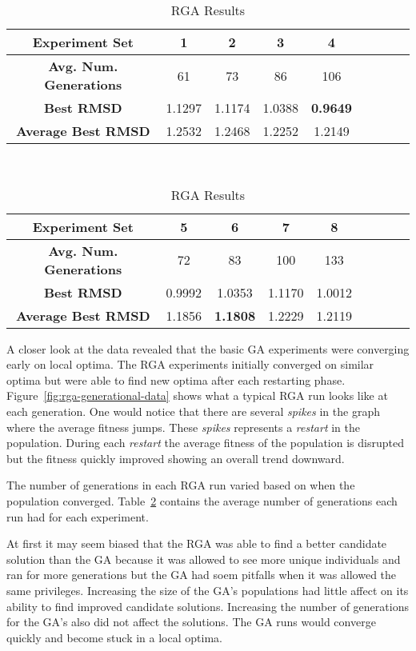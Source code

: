 \begin{table}
	\centering
	\begin{tabular}{ | >{\bfseries}c | c | c | c | c | c | c | c | c | }
		\hline
		Experiment Set & 1 & 2 & 3 & 4 \\ \hline
		Avg. Num. Generations & 61 & 73 & 86 & 106 \\ \hline
		Best RMSD & 1.1297 & 1.1174 & 1.0388 & \textbf{0.9649} \\ \hline
		Average Best RMSD & 1.2532 & 1.2468 & 1.2252 & 1.2149 \\ \hline
	\end{tabular}
	\\
	\vspace{3 mm}
	\begin{tabular}{ | >{\bfseries}c | c | c | c | c | c | c | c | c | }
		\hline
		Experiment Set & 5 & 6 & 7 & 8 \\ \hline
		Avg. Num. Generations & 72 & 83 & 100 & 133 \\ \hline
		Best RMSD & 0.9992 & 1.0353 & 1.1170 & 1.0012 \\ \hline
		Average Best RMSD & 1.1856 & \textbf{1.1808} & 1.2229 & 1.2119 \\ \hline
	\end{tabular}
	\caption{RGA Results}
	\label{table:rga-results}
\end{table}

A closer look at the data revealed that the basic GA experiments were converging early on local optima. The RGA experiments initially converged on similar optima but were able to find new optima after each restarting phase. Figure~\ref{fig:rga-generational-data} shows what a typical RGA run looks like at each generation. One would notice that there are several \textit{spikes} in the graph where the average fitness jumps. These \textit{spikes} represents a \textit{restart} in the population. During each \textit{restart} the average fitness of the population is disrupted but the fitness quickly improved showing an overall trend downward.

The number of generations in each RGA run varied based on when the population converged. Table~\ref{table:rga-results} contains the average number of generations each run had for each experiment.

At first it may seem biased that the RGA was able to find a better candidate solution than the GA because it was allowed to see more unique individuals and ran for more generations but the GA had soem pitfalls when it was allowed the same privileges. Increasing the size of the GA's populations had little affect on its ability to find improved candidate solutions. Increasing the number of generations for the GA's also did not affect the solutions. The GA runs would converge quickly and become stuck in a local optima.

